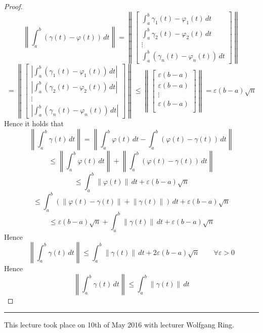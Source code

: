 \documentclass[a4paper,landscape,twocolumn]{article}
\theoremstyle{definition}
\newcommand\abs[1]{\left|#1\right|}
\newcommand\meta[3]{\hrule{} This #1 took place on #2 with lecturer #3.\par}
\newcommand\norm[1]{\left\|#1\right\|}
\begin{document}
\begin{proof}
\[   \] \[
    \norm{\int_a^b (\gamma(t) - \varphi(t)) \, dt} = \norm{
      \begin{bmatrix}
        \int_a^b \gamma_1(t) - \varphi_1(t) \, dt \\
        \int_a^b \gamma_2(t) - \varphi_2(t) \, dt \\
        \vdots \\
        \int_a^b (\gamma_n(t) - \varphi_n(t)) \, dt
      \end{bmatrix}
    }
  \] \[
    = \norm{\begin{bmatrix}
      \abs{\int_a^b (\gamma_1(t) - \varphi_1(t)) \, dt} \\
      \abs{\int_a^b (\gamma_2(t) - \varphi_2(t)) \, dt} \\
      \vdots \\
      \abs{\int_a^b (\gamma_n(t) - \varphi_n(t)) \, dt}
    \end{bmatrix}}
    \leq
    \norm{\begin{bmatrix}
      \varepsilon (b - a) \\
      \varepsilon (b - a) \\
      \vdots \\
      \varepsilon (b - a) \\
    \end{bmatrix}}
    = \varepsilon (b - a) \sqrt{n}
  \]
  Hence it holds that
  \[
    \norm{\int_a^b \gamma(t) \, dt}
    = \norm{\int_a^b \varphi(t) \, dt - \int_a^b (\varphi(t) - \gamma(t)) \, dt}
  \] \[
    \leq \norm{\int_a^b \varphi(t) \, dt} + \norm{\int_a^b (\varphi(t) - \gamma(t)) \, dt}
  \] \[
    \leq \int_a^b \norm{\varphi(t)} \, dt + \varepsilon (b - a) \sqrt{n}
  \] \[
    \leq \int_a^b \left(\norm{\varphi(t) - \gamma(t)} + \norm{\gamma(t)}\right) \, dt
    + \varepsilon (b - a) \sqrt{n}
  \] \[
    \leq \varepsilon (b - a) \sqrt{n} + \int_a^b \norm{\gamma(t)} \, dt + \varepsilon (b - a) \sqrt{n}
  \]
  Hence
  \[ \norm{\int_a^b \gamma(t) \, dt} \leq \int_a^b \norm{\gamma(t)} \, dt + 2 \varepsilon (b - a) \sqrt{n} \qquad \forall \varepsilon > 0 \]
  Hence
  \[ \norm{\int_a^b \gamma(t) \, dt} \leq \int_a^b \norm{\gamma(t)} \, dt \]
\end{proof}

\meta{lecture}{10th of May 2016}{Wolfgang Ring}
\end{document}
